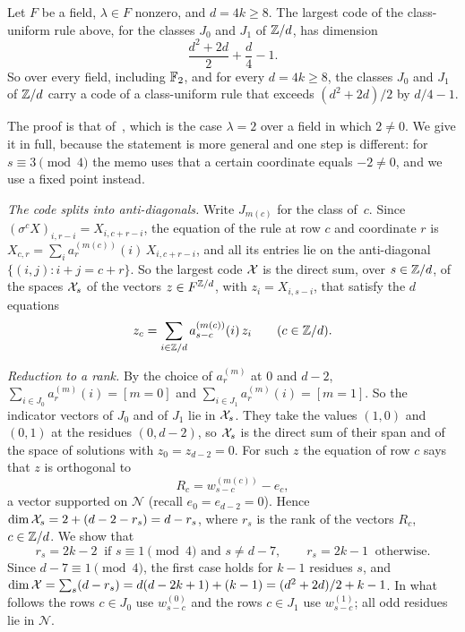 \begin{proposition}\label{prop:two-class}
\notformalized
Let $F$ be a field, $\lambda\in F$ nonzero, and $d=4k\ge8$. The largest code of the class-uniform rule above, for the
classes $J_0$ and $J_1$ of $\mathbb{Z}/d$, has dimension
\[
  \frac{d^2+2d}2+\frac d4-1 .
\]
So over every field, including $\mathbb{F}_2$, and for every $d=4k\ge8$, the classes $J_0$ and $J_1$ of $\mathbb{Z}/d$ carry a code
of a class-uniform rule that exceeds $(d^2+2d)/2$ by $d/4-1$.
\end{proposition}

\begin{informalproof}
The proof is that of~\cite[Theorem~4.8]{ClassUniformMemo2026}, which is the case $\lambda=2$ over a field in which
$2\ne0$. We give it in full, because the statement is more general and one step is different: for
$s\equiv3\pmod4$ the memo uses that a certain coordinate equals $-2\ne0$, and we use a fixed point instead.

\emph{The code splits into anti-diagonals.} Write $J_{m(c)}$ for the class of~$c$. Since
$(\sigma^cX)_{i,r-i}=X_{i,c+r-i}$, the equation of the rule at row $c$ and coordinate $r$ is
$X_{c,r}=\sum_ia^{(m(c))}_r(i)\,X_{i,c+r-i}$, and all its entries lie on the anti-diagonal $\{(i,j):i+j=c+r\}$. So the
largest code $\mathcal{X}$ is the direct sum, over $s\in\mathbb{Z}/d$, of the spaces $\mathcal{X}_s$ of the vectors $z\in F^{\mathbb{Z}/d}$, with
$z_i=X_{i,s-i}$, that satisfy the $d$ equations
\[
  z_c=\sum_{i\in\mathbb{Z}/d}a^{(m(c))}_{s-c}(i)\,z_i\qquad(c\in\mathbb{Z}/d).
\]

\emph{Reduction to a rank.} By the choice of $a^{(m)}_r$ at $0$ and $d-2$, $\sum_{i\in J_0}a^{(m)}_r(i)=[m=0]$ and
$\sum_{i\in J_1}a^{(m)}_r(i)=[m=1]$. So the indicator vectors of $J_0$ and of $J_1$ lie in $\mathcal{X}_s$. They take the values
$(1,0)$ and $(0,1)$ at the residues $(0,d-2)$, so $\mathcal{X}_s$ is the direct sum of their span and of the space of solutions
with $z_0=z_{d-2}=0$. For such $z$ the equation of row $c$ says that $z$ is orthogonal to
\[
  R_c=w^{(m(c))}_{s-c}-e_c ,
\]
a vector supported on $\mathcal N$ (recall $e_0=e_{d-2}=0$). Hence $\dim\mathcal{X}_s=2+(d-2-r_s)=d-r_s$, where $r_s$ is the rank
of the vectors $R_c$, $c\in\mathbb{Z}/d$. We show that
\[
  r_s=2k-2\ \text{ if }s\equiv1\!\!\pmod4\text{ and }s\ne d-7,\qquad r_s=2k-1\ \text{ otherwise}.
\]
Since $d-7\equiv1\pmod4$, the first case holds for $k-1$ residues $s$, and
$\dim\mathcal{X}=\sum_s(d-r_s)=d(d-2k+1)+(k-1)=(d^2+2d)/2+k-1$. In what follows the rows $c\in J_0$ use $w^{(0)}_{s-c}$ and the
rows $c\in J_1$ use $w^{(1)}_{s-c}$; all odd residues lie in $\mathcal N$.


\end{informalproof}
